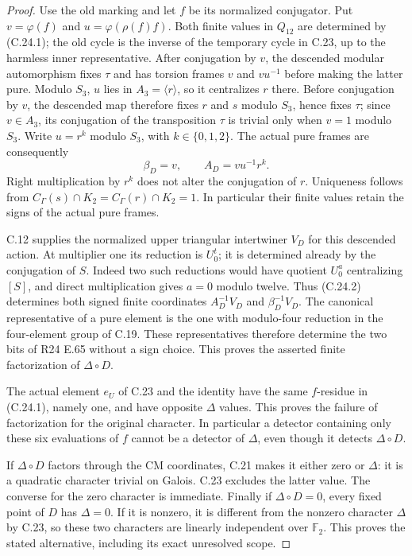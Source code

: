 \begin{proof}
Use the old marking and let $f$ be its normalized
conjugator. Put $v=\varphi(f)$ and
$u=\varphi(\rho(f)f)$. Both finite values in
$Q_{12}$ are determined by (C.24.1); the old
cycle is the inverse of the temporary cycle in
C.23, up to the harmless inner representative.
After conjugation by $v$, the descended modular
automorphism fixes $\tau$ and has torsion frames
$v$ and $vu^{-1}$ before making the latter pure.
Modulo $S_3$, $u$ lies in $A_3=\langle r\rangle$,
so it centralizes $r$ there. Before conjugation
by $v$, the descended map therefore fixes $r$
and $s$ modulo $S_3$, hence fixes $\tau$;
since $v\in A_3$, its conjugation
of the transposition $\tau$ is trivial only
when $v=1$ modulo $S_3$. Write $u=r^k$ modulo
$S_3$, with $k\in\{0,1,2\}$. The actual pure
frames are consequently
\[
                    \beta_D=v,\qquad
                    A_D=vu^{-1}r^k.
 \tag{C.24.2}
\]
Right multiplication by $r^k$ does not alter
the conjugation of $r$. Uniqueness follows from
$C_\Gamma(s)\cap K_2=C_\Gamma(r)\cap K_2=1$.
In particular their finite values retain the
signs of the actual pure frames.

C.12 supplies the normalized upper triangular
intertwiner $V_D$ for this descended action.
At multiplier one its reduction is $U_0^t$;
it is determined already by the conjugation
of $S$. Indeed two such reductions would have
quotient $U_0^a$ centralizing $[S]$, and direct
multiplication gives $a=0$ modulo twelve.
Thus (C.24.2) determines both signed finite
coordinates $A_D^{-1}V_D$ and $\beta_D^{-1}V_D$.
The canonical representative of a pure element
is the one with modulo-four reduction in the
four-element group of C.19. These representatives
therefore determine the two bits of R24 E.65
without a sign choice. This proves the asserted
finite factorization of $\Delta\circ D$.

The actual element $e_U$ of C.23 and the identity
have the same $f$-residue in (C.24.1), namely one,
and have opposite $\Delta$ values. This proves
the failure of factorization for the original
character. In particular a detector containing
only these six evaluations of $f$ cannot be a
detector of $\Delta$, even though it detects
$\Delta\circ D$.

If $\Delta\circ D$ factors through the CM
coordinates, C.21 makes it either zero or
$\Delta$: it is a quadratic character trivial
on Galois. C.23 excludes the latter value.
The converse for the zero character is immediate.
Finally if $\Delta\circ D=0$, every fixed point
of $D$ has $\Delta=0$. If it is nonzero, it
is different from the nonzero character $\Delta$
by C.23, so these two characters are linearly
independent over $\mathbb F_2$. This proves
the stated alternative, including its exact
unresolved scope.
\end{proof}


